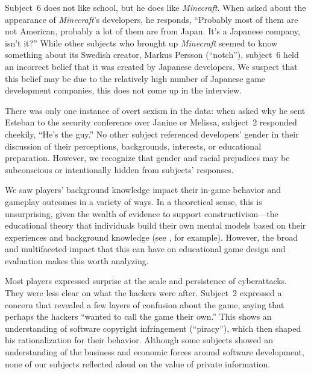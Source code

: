 \documentclass[letterpaper]{article}
\begin{document}
Subject~6 does not like school, but he does
like \textit{Minecraft}. When asked about the appearance of \textit{Minecraft}'s
developers, he responds, ``Probably most of them are not American,
probably a lot of them are from Japan. It's a Japanese company, isn't it?''
While other subjects who brought up \textit{Minecraft} seemed to know something
about its Swedish creator, Markus Persson (``notch''), subject~6 held
an incorrect belief that it was created by Japanese developers. 
We suspect that this belief may be due to the relatively high number
of Japanese game development companies, this does not come up in the interview.

There was only one instance of overt sexism in the data:
when asked why he sent Esteban to the security conference over
Janine or Melissa, subject~2 responded cheekily, ``He's the guy.''
No other subject referenced developers' gender in their discussion
of their perceptions, backgrounds, interests, or educational preparation.
However, we recognize that gender and racial prejudices may be
subconscious or intentionally hidden from subjects' responses.




We saw players' background knowledge impact their in-game behavior
and gameplay outcomes in a variety of ways.
In a theoretical sense, this is unsurprising, given the wealth of
evidence to support constructivism---the educational theory that
individuals build their own mental models based on their experiences
and background knowledge (see \citet{Duffy1996}, for example).
However, the broad and multifaceted impact that this can have on
educational game design and evaluation makes this worth analyzing.

Most players expressed surprise at the scale and persistence
of cyberattacks. They were less clear on what the hackers
were after. Subject~2 expressed a concern that revealed a few
layers of confusion about the game, saying that perhaps the
hackers ``wanted to call the game their own.''
This shows an understanding of software copyright infringement (``piracy''),
which then shaped his rationalization for their behavior.
Although some subjects showed an understanding of the business and
economic forces around software development, none of our subjects
reflected aloud on the value of private information.
\end{document}
